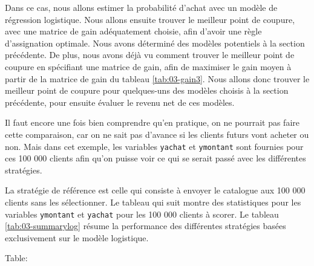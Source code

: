 \documentclass[
  11pt,
  letterpaper,
]{book}
\theoremstyle{definition}
\theoremstyle{definition}
\theoremstyle{definition}
\theoremstyle{definition}
\theoremstyle{remark}
\begin{document}
Dans ce cas, nous allons estimer la probabilité d'achat avec un modèle de régression logistique. Nous allons ensuite trouver le meilleur point de coupure, avec une matrice de gain adéquatement choisie, afin d'avoir une règle d'assignation optimale. Nous avons déterminé des modèles potentiels à la section précédente. De plus, nous avons déjà vu comment trouver le meilleur point de coupure en spécifiant une matrice de gain, afin de maximiser le gain moyen à partir de la matrice de gain du tableau \ref{tab:03-gain3}. Nous allons donc trouver le meilleur point de coupure pour quelques-uns des modèles choisis à la section précédente, pour ensuite évaluer le revenu net de ces modèles.

Il faut encore une fois bien comprendre qu'en pratique, on ne pourrait pas faire cette comparaison, car on ne sait pas d'avance si les clients futurs vont acheter ou non. Mais dans cet exemple, les variables \texttt{yachat} et \texttt{ymontant} sont fournies pour ces 100 000 clients afin qu'on puisse voir ce qui se serait passé avec les différentes stratégies.

La stratégie de référence est celle qui consiste à envoyer le catalogue aux 100 000 clients sans les sélectionner. Le tableau qui suit montre des statistiques pour les variables \texttt{ymontant} et \texttt{yachat} pour les 100 000 clients à scorer. Le tableau \ref{tab:03-summarylog} résume la performance des différentes stratégies basées exclusivement sur le modèle logistique.

Table:
\end{document}
